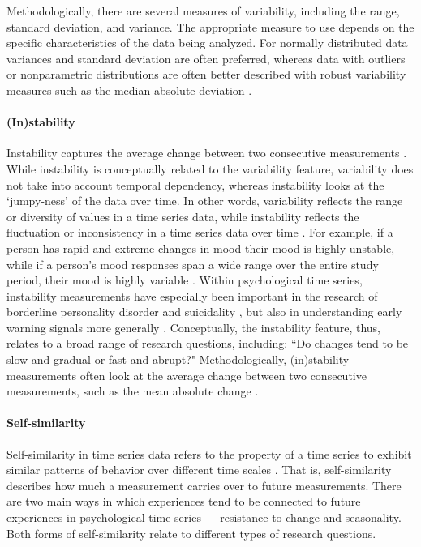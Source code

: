 \documentclass[man, 12pt, a4paper, mask, floatsintext]{apa7}
\theoremstyle{break}
\theoremstyle{plain}
\begin{document}
Methodologically, there are several measures of variability, including the range, standard deviation, and variance. The appropriate measure to use depends on the specific characteristics of the data being analyzed. For normally distributed data variances and standard deviation are often preferred, whereas data with outliers or nonparametric distributions are often better described with robust variability measures such as the median absolute deviation \citep{weisberg1992}.

\paragraph{(In)stability} Instability captures the average change between two consecutive measurements \citep{ebner-priemer2009}. While instability is conceptually related to the variability feature, variability does not take into account temporal dependency, whereas instability looks at the `jumpy-ness' of the data over time. In other words, variability reflects the range or diversity of values in a time series data, while instability reflects the fluctuation or inconsistency in a time series data over time  \citep{trull2008}. For example, if a person has rapid and extreme changes in mood their mood is highly unstable, while if a person's mood responses span a wide range over the entire study period, their mood is highly variable \citep{jahng2008}. Within psychological time series, instability measurements have especially been important in the research of borderline personality disorder \citep{trull2008} and suicidality \citep{kivela2022}, but also in understanding early warning signals more generally \citep{wichers2019}. Conceptually, the instability feature, thus, relates to a broad range of research questions, including: ``Do changes tend to be slow and gradual or fast and abrupt?" Methodologically, (in)stability measurements often look at the average change between two consecutive measurements, such as the mean absolute change \citep[e.g.,][]{ebner-priemer2009,barandas2020}. 

\paragraph{Self-similarity} Self-similarity in time series data refers to the property of a time series to exhibit similar patterns of behavior over different time scales \citep{dmello2021}. That is, self-similarity describes how much a measurement carries over to future measurements. There are two main ways in which experiences tend to be connected to future experiences in psychological time series --- resistance to change and seasonality. Both forms of self-similarity relate to different types of research questions. 
\end{document}
